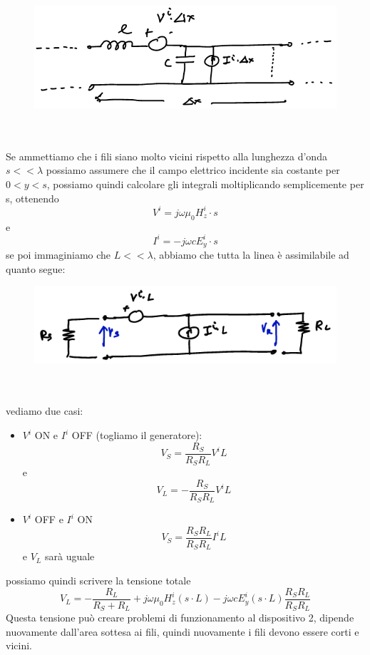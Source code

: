 \documentclass[oneside, 12pt]{extbook}
\begin{document}
\begin{figure}[!h]
	\includegraphics[scale=0.3]{immagini/susc_circ_2.png}
\end{figure}
\\\\Se ammettiamo che i fili siano molto vicini rispetto alla lunghezza d'onda $s << \lambda$ possiamo assumere che il campo elettrico incidente sia costante per $0 < y < s$, possiamo quindi calcolare gli integrali moltiplicando semplicemente per s, ottenendo 
\begin{equation}
	V^i = j \omega \mu_0 H_z^i \cdot s
\end{equation}
e 
\begin{equation}
	I^i = -j \omega c E_y^i \cdot s
\end{equation}	
se poi immaginiamo che $L << \lambda$, abbiamo che tutta la linea è assimilabile ad quanto segue:\\
\begin{figure}[!h]
	\includegraphics[scale=0.3]{immagini/susc_circ_3.png}
\end{figure}
\\\\vediamo due casi:
\begin{itemize}
	\item $V^i$ ON e $I^i$ OFF (togliamo il generatore):
	\begin{equation}
		V_S = \frac{R_S}{R_S R_L} V^i L
	\end{equation}
	e
	\begin{equation}
		V_L = -\frac{R_S}{R_S R_L} V^i L
	\end{equation}
	\item $V^i$ OFF e $I^i$ ON
	\begin{equation}
		V_S = \frac{R_S R_L}{R_S R_L} I^i L	
	\end{equation}
	e $V_L$ sarà uguale 
\end{itemize}
possiamo quindi scrivere la tensione totale 
\begin{equation}
	V_L = - \dfrac{R_L}{R_S + R_L} + j \omega \mu_0 H_z^i (s\cdot L) - j \omega c E_y^i (s \cdot L) \frac{R_S R_L}{R_S R_L}
\end{equation}
Questa tensione può creare problemi di funzionamento al dispositivo 2, dipende nuovamente dall'area sottesa ai fili, quindi nuovamente i fili devono essere corti e vicini.
\end{document}
